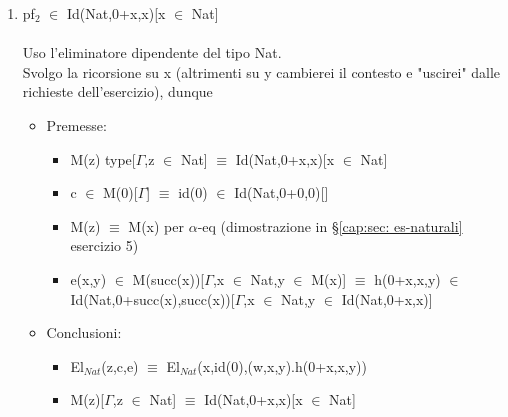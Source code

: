 \begin{enumerate}
\noindent
\item pf$_2$ $\in$ Id(Nat,0+x,x)[x $\in$ Nat]\\\\
\noindent
Uso l'eliminatore dipendente del tipo Nat.\\
Svolgo la ricorsione su x (altrimenti su y cambierei il contesto e "uscirei" dalle richieste dell'esercizio), dunque
\begin{itemize}
\item Premesse:
\begin{itemize}
\item M(z) type[$\Gamma$,z $\in$ Nat] $\equiv$ Id(Nat,0+x,x)[x $\in$ Nat]
\item c $\in$ M(0)[$\Gamma$] $\equiv$ id(0) $\in$ Id(Nat,0+0,0)[]
\item M(z) $\equiv$ M(x) per $\alpha$-eq (dimostrazione in \S\ref{cap:sec: es-naturali} esercizio 5)
\item e(x,y) $\in$ M(succ(x))[$\Gamma$,x $\in$ Nat,y $\in$ M(x)] $\equiv$ h(0+x,x,y) $\in$ Id(Nat,0+succ(x),succ(x))[$\Gamma$,x $\in$ Nat,y $\in$ Id(Nat,0+x,x)]
\end{itemize}
\item Conclusioni:
\begin{itemize}
\item El$_{Nat}$(z,c,e) $\equiv$ El$_{Nat}$(x,id(0),(w,x,y).h(0+x,x,y))
\item M(z)[$\Gamma$,z $\in$ Nat] $\equiv$ Id(Nat,0+x,x)[x $\in$ Nat]
\end{itemize}
\end{itemize}

\end{enumerate}


